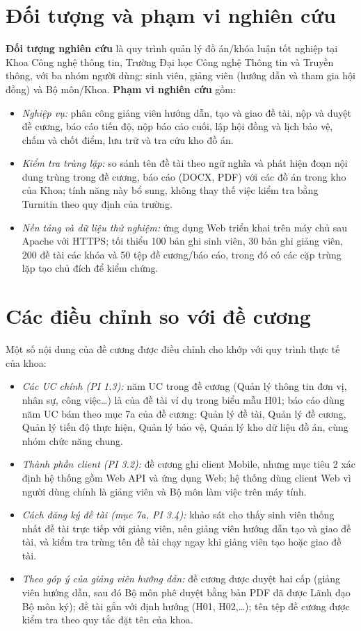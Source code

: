\documentclass[../main.tex]{subfiles}
\begin{document}
\section*{Đối tượng và phạm vi nghiên cứu}

\textbf{Đối tượng nghiên cứu} là quy trình quản lý đồ án/khóa luận tốt nghiệp tại Khoa Công nghệ thông tin, Trường Đại học Công nghệ Thông tin và Truyền thông, với ba nhóm người dùng: sinh viên, giảng viên (hướng dẫn và tham gia hội đồng) và Bộ môn/Khoa. \textbf{Phạm vi nghiên cứu} gồm:
\begin{itemize}
    \item \textit{Nghiệp vụ:} phân công giảng viên hướng dẫn, tạo và giao đề tài, nộp và duyệt đề cương, báo cáo tiến độ, nộp báo cáo cuối, lập hội đồng và lịch bảo vệ, chấm và chốt điểm, lưu trữ và tra cứu kho đồ án.
    \item \textit{Kiểm tra trùng lặp:} so sánh tên đề tài theo ngữ nghĩa và phát hiện đoạn nội dung trùng trong đề cương, báo cáo (DOCX, PDF) với các đồ án trong kho của Khoa; tính năng này bổ sung, không thay thế việc kiểm tra bằng Turnitin theo quy định của trường.
    \item \textit{Nền tảng và dữ liệu thử nghiệm:} ứng dụng Web triển khai trên máy chủ sau Apache với HTTPS; tối thiểu 100 bản ghi sinh viên, 30 bản ghi giảng viên, 200 đề tài các khóa và 50 tệp đề cương/báo cáo, trong đó có các cặp trùng lặp tạo chủ đích để kiểm chứng.
\end{itemize}

\section*{Các điều chỉnh so với đề cương}

Một số nội dung của đề cương được điều chỉnh cho khớp với quy trình thực tế của khoa:
\begin{itemize}
    \item \textit{Các UC chính (PI 1.3):} năm UC trong đề cương (Quản lý thông tin đơn vị, nhân sự, công việc\ldots) là của đề tài ví dụ trong biểu mẫu H01; báo cáo dùng năm UC bám theo mục 7a của đề cương: Quản lý đề tài, Quản lý đề cương, Quản lý tiến độ thực hiện, Quản lý bảo vệ, Quản lý kho dữ liệu đồ án, cùng nhóm chức năng chung.
    \item \textit{Thành phần client (PI 3.2):} đề cương ghi client Mobile, nhưng mục tiêu 2 xác định hệ thống gồm Web API và ứng dụng Web; hệ thống dùng client Web vì người dùng chính là giảng viên và Bộ môn làm việc trên máy tính.
    \item \textit{Cách đăng ký đề tài (mục 7a, PI 3.4):} khảo sát cho thấy sinh viên thống nhất đề tài trực tiếp với giảng viên, nên giảng viên hướng dẫn tạo và giao đề tài, và kiểm tra trùng tên đề tài chạy ngay khi giảng viên tạo hoặc giao đề tài.
    \item \textit{Theo góp ý của giảng viên hướng dẫn:} đề cương được duyệt hai cấp (giảng viên hướng dẫn, sau đó Bộ môn phê duyệt bằng bản PDF đã được Lãnh đạo Bộ môn ký); đề tài gắn với định hướng (H01, H02,\ldots); tên tệp đề cương được kiểm tra theo quy tắc đặt tên của khoa.
\end{itemize}
\end{document}
